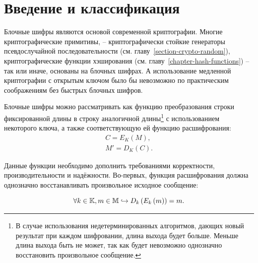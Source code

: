 \section{Введение и классификация}\label{section-block-ciphers-intro}

Блочные шифры являются основой современной криптографии. Многие криптографические примитивы, -- криптографически стойкие генераторы псевдослучайной последовательности (см. главу~\ref{section-crypto-random}), криптографические функции хэширования (см. главу~\ref{chapter-hash-functions}) -- так или иначе, основаны на блочных шифрах. А использование медленной криптографии с открытым ключом было бы невозможно по практическим соображениям без быстрых блочных шифров.

Блочные шифры можно рассматривать как функцию преобразования строки фиксированной длины в строку аналогичной длины\footnote{В случае использования недетерминированных алгоритмов, дающих новый результат при каждом шифровании, длина выхода будет больше. Меньше длина выхода быть не может, так как будет невозможно однозначно восстановить произвольное сообщение.} с использованием некоторого ключа, а также соответствующую ей функцию расшифрования:
\[\begin{array}{l}
	C = E_K\left( M \right), \\
	M'= D_K\left( C \right).
\end{array}\]

Данные функции необходимо дополнить требованиями корректности, производительности и надёжности. Во-первых, функция расшифрования должна однозначно восстанавливать произвольное исходное сообщение:

\[ \forall k \in \mathbb{K}, m \in \mathbb{M} \hookrightarrow D_k \left( E_k\left( m \right) \right) = m. \]

